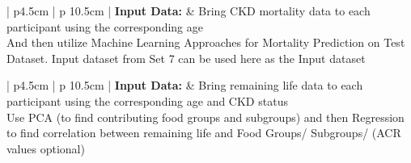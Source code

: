 \begin{table}[!htb]
\caption{\textbf{Set 8: Experiments using Regression: No aggregated (on age groups) survey data} }
\vspace{0.25cm}
\begin{tabular}{| p{4.5cm}  |  p {10.5cm} | }
\hline
\noindent \textbf{Input Data:} & Bring CKD mortality data to each participant using the corresponding age\\
\hline
{} { { \noindent  And then utilize Machine Learning Approaches for Mortality Prediction on Test Dataset.  Input dataset from Set 7 can be used here as the Input dataset }} \\
\hline
\end{tabular}
\end{table}

\begin{table}[!htb]
\caption{\textbf{Set 9: Remaining Life for CKD Patients and Food Groups/Subgroups: No aggregated survey data} }
\label{experiment-end}
\vspace{0.25cm}
\begin{tabular}{| p{4.5cm}  |  p {10.5cm} | }
\hline
\noindent \textbf{Input Data:} & {Bring remaining life data to each participant using the corresponding age  and CKD status} \\
\hline
{} { Use PCA (to find contributing food groups and subgroups) and then Regression to find  correlation between remaining life  and Food Groups/ Subgroups/ (ACR values optional)  } \\
\hline
\end{tabular}
\end{table}
